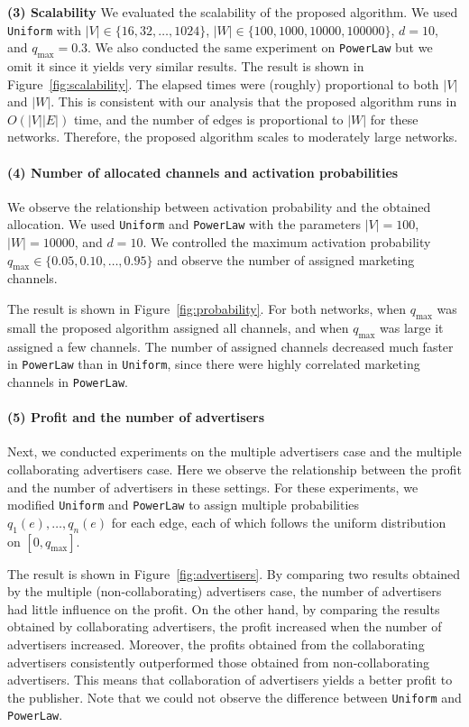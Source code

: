 \documentclass[letterpaper]{article}
\theoremstyle{definition}
\begin{document}
\textbf{(3) Scalability} 
We evaluated the scalability of the proposed algorithm.
We used \texttt{Uniform} with $|V| \in \{16, 32, \ldots, 1024\}$, $|W| \in \{100, 1000, 10000, 100000\}$, $d = 10$, and $q_{\text{max}} = 0.3$.
We also conducted the same experiment on \texttt{PowerLaw} but we omit it since it yields very similar results.  The result is shown in Figure~\ref{fig:scalability}.
The elapsed times were (roughly) proportional to both $|V|$ and $|W|$.
This is consistent with our analysis that the proposed algorithm runs in $O(|V| |E|)$ time, and the number of edges is proportional to $|W|$ for these networks.
Therefore, the proposed algorithm scales to moderately large networks.

\paragraph{(4) Number of allocated channels and activation probabilities}

We observe the relationship between activation probability and the obtained allocation.
We used \texttt{Uniform} and \texttt{PowerLaw} with the parameters $|V| = 100$,  $|W| = 10000$, and $d = 10$.
We controlled the maximum activation probability $q_{\text{max}} \in \{0.05, 0.10, \ldots, 0.95\}$ and observe the number of assigned marketing channels.

The result is shown in Figure~\ref{fig:probability}.
For both networks, when $q_{\text{max}}$ was small the proposed algorithm assigned all channels, and when $q_{\text{max}}$ was large it assigned a few channels.
The number of assigned channels decreased much faster in \texttt{PowerLaw} than in \texttt{Uniform}, since there were highly correlated marketing channels in \texttt{PowerLaw}.

\paragraph{(5) Profit and the number of advertisers}

Next, we conducted experiments on the multiple advertisers case and the multiple collaborating advertisers case.
Here we observe the relationship between the profit and the number of advertisers in these settings.
For these experiments, we modified \texttt{Uniform} and \texttt{PowerLaw}
to assign multiple probabilities $q_1(e), \ldots, q_n(e)$ for each edge, each of which follows the uniform distribution on $[0, q_{\text{max}}]$.

The result is shown in Figure~\ref{fig:advertisers}.
By comparing two results obtained by the multiple (non-collaborating) advertisers case, the number of advertisers had little influence on the profit.
On the other hand, by comparing the results obtained by collaborating advertisers, the profit increased when the number of advertisers increased.
Moreover, the profits obtained from the collaborating advertisers consistently outperformed those obtained from non-collaborating advertisers.
This means that collaboration of advertisers yields a better profit to the publisher.
Note that we could not observe the difference between \texttt{Uniform} and \texttt{PowerLaw}.
\end{document}
